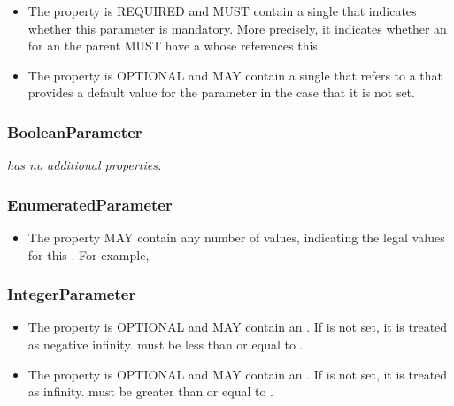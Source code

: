 
\begin{itemize}
\item \label{sec:required}
The  property is REQUIRED and MUST contain a single  that indicates whether this parameter is mandatory. More precisely, it indicates whether an  for an  the parent  MUST have a  whose  references this 

\item \label{sec:defaultValue}
The  property is OPTIONAL and MAY contain a single  that refers to a  that provides a default value for the parameter in the case that it is not set.
\end{itemize}


\subsubsection{BooleanParameter}
\label{sec:BooleanParameter}

{\em {} has no additional properties.}

\subsubsection{EnumeratedParameter}
\label{sec:EnumeratedParameter}

\begin{itemize}
\item \label{sec:allowedValue}
The  property MAY contain any number of  values, indicating the legal values for this . 
For example, 
\end{itemize}

\subsubsection{IntegerParameter}
\label{sec:IntegerParameter}

\begin{itemize}
\item \label{sec:minValue}
The  property is OPTIONAL and MAY contain an .
If  is not set, it is treated as negative infinity.
 must be less than or equal to .

\item \label{sec:maxValue}
The  property is OPTIONAL and MAY contain an .
If  is not set, it is treated as infinity.
 must be greater than or equal to .
\end{itemize}

